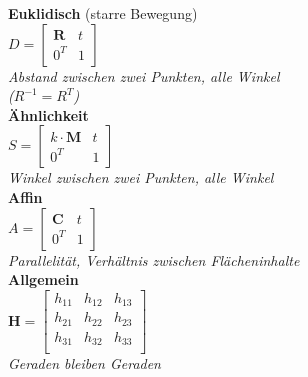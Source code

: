 \textbf{Euklidisch} (starre Bewegung) \\
$D = \begin{bmatrix}
    \mathbf{R} & t \\
    0^T & 1
\end{bmatrix}$ \\
\textit{Abstand zwischen zwei Punkten, alle Winkel} \\
\textit{($R^{-1} = R^T$)} \\

\textbf{Ähnlichkeit} \\
$S = \begin{bmatrix}
    k \cdot \mathbf{M} & t \\
    0^T & 1
\end{bmatrix}$ \\
\textit{Winkel zwischen zwei Punkten, alle Winkel} \\

\textbf{Affin} \\
$A = \begin{bmatrix}
    \mathbf{C} & t \\
    0^T & 1
\end{bmatrix}$ \\
\textit{Parallelität, Verhältnis zwischen Flächeninhalte} \\

\textbf{Allgemein} \\
$\mathbf{H} = \begin{bmatrix}
    h_{11} & h_{12} & h_{13} \\
    h_{21} & h_{22} & h_{23} \\
    h_{31} & h_{32} & h_{33} \\
\end{bmatrix}$ \\
\textit{Geraden bleiben Geraden} \\
